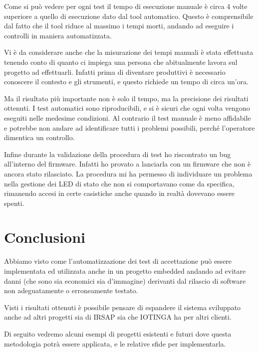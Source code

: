 \documentclass[12pt,a4paper,twoside,titlepage]{book}
\begin{document}

Come si può vedere per ogni test il tempo di esecuzione manuale è circa 4 volte superiore a quello di esecuzione 
dato dal tool automatico. Questo è comprensibile dal fatto che il tool riduce al massimo i tempi morti, andando ad 
eseguire i controlli in maniera automatizzata. 

Vi è da considerare anche che la misurazione dei tempi manuali è stata effettuata tenendo conto di 
quanto ci impiega una persona che abitualmente lavora sul progetto ad effettuarli. Infatti prima di diventare 
produttivi è necessario conoscere il contesto e gli strumenti, e questo richiede un tempo di circa un'ora. 

Ma il risultato più importante non è solo il tempo, ma la precisione dei risultati ottenuti. I test automatici 
sono riproducibili, e si è sicuri che ogni volta vengono eseguiti nelle medesime condizioni. Al contrario il 
test manuale è meno affidabile e potrebbe non andare ad identificare tutti i problemi possibili, perché l'operatore 
dimentica un controllo. 

Infine durante la validazione della procedura di test ho riscontrato un bug all'interno del firmware. 
Infatti ho provato a lanciarla con un firmware che non è ancora stato rilasciato. La procedura mi ha permesso di 
individuare un problema nella gestione dei LED di stato che non si comportavano come da specifica, rimanendo 
accesi in certe casistiche anche quando in realtà dovevano essere spenti. 

\chapter{Conclusioni}

Abbiamo visto come l'automatizzazione dei test di accettazione può essere implementata
ed utilizzata anche in un progetto embedded andando ad evitare danni (che sono sia economici
sia d'immagine) derivanti dal rilascio di software non adeguatamente o erroneamente testato.

Visti i risultati ottenuti è possibile pensare di espandere il sistema sviluppato
anche ad altri progetti sia di IRSAP sia che IOTINGA ha per altri clienti.

Di seguito vedremo alcuni esempi di progetti esistenti e futuri dove questa metodologia
potrà essere applicata, e le relative sfide per implementarla.
\end{document}
